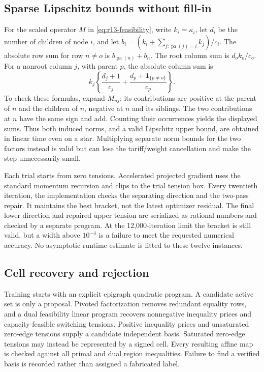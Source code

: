 \documentclass[11pt,letterpaper]{article}
\theoremstyle{definition}
\newcommand{\1}{\mathbf 1}
\begin{document}
\subsection{Sparse Lipschitz bounds without fill-in}
For the scaled operator $M$ in \eqref{eq:r13-feasibility}, write $k_i=\kappa_i$, let $d_i$ be the number of children of node $i$, and let $b_i=(k_i+\sum_{j:\operatorname{pa}(j)=i}k_j)/c_i$. The absolute row sum for row $n\ne o$ is $b_{\operatorname{pa}(n)}+b_n$. The root column sum is $d_ok_o/c_o$. For a nonroot column $j$, with parent $p$, the absolute column sum is
\[
 k_j\left\{\frac{d_j+1}{c_j}+\frac{d_p+\mathbf1_{\{p\ne o\}}}{c_p}\right\}.
\]
To check these formulas, expand $M_{nj}$: its contributions are positive at the parent of $n$ and the children of $n$, negative at $n$ and its siblings. The two contributions at $n$ have the same sign and add. Counting their occurrences yields the displayed sums. Thus both induced norms, and a valid Lipschitz upper bound, are obtained in linear time even on a star. Multiplying separate norm bounds for the two factors instead is valid but can lose the tariff/weight cancellation and make the step unnecessarily small.

Each trial starts from zero tensions. Accelerated projected gradient uses the standard momentum recursion and clips to the trial tension box. Every twentieth iteration, the implementation checks the separating direction and the two-pass repair. It maintains the best bracket, not the latest optimizer residual. The final lower direction and repaired upper tension are serialized as rational numbers and checked by a separate program. At the 12,000-iteration limit the bracket is still valid, but a width above $10^{-4}$ is a failure to meet the requested numerical accuracy. No asymptotic runtime estimate is fitted to these twelve instances.

\subsection{Cell recovery and rejection}
Training starts with an explicit epigraph quadratic program. A candidate active set is only a proposal. Pivoted factorization removes redundant equality rows, and a dual feasibility linear program recovers nonnegative inequality prices and capacity-feasible switching tensions. Positive inequality prices and unsaturated zero-edge tensions supply a candidate independent basis. Saturated zero-edge tensions may instead be represented by a signed cell. Every resulting affine map is checked against all primal and dual region inequalities. Failure to find a verified basis is recorded rather than assigned a fabricated label.
\end{document}
